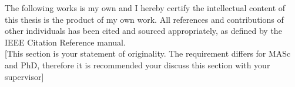 {}

The following works is my own and I hereby certify the intellectual content of this thesis is the product of my own work. All references and contributions of other individuals has been cited and sourced appropriately, as defined by the IEEE Citation Reference manual.\\[0.3in]

[This section is your statement of originality. The requirement differs for MASc and PhD, therefore it is recommended your discuss this section with your supervisor] 

